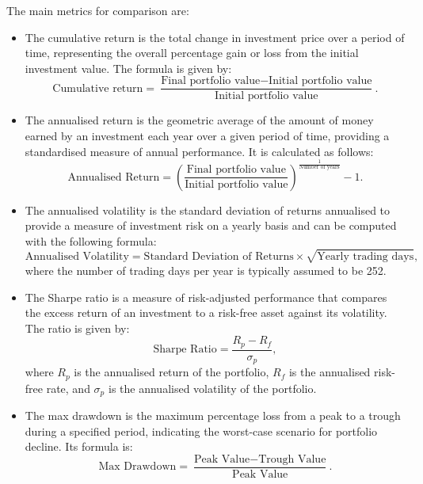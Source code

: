 The main metrics for comparison are:
\begin{itemize}
    \item The cumulative return is the total change in investment price over a period of time, representing the overall percentage gain or loss from the initial investment value. The formula is given by:
    \begin{equation}
        \text{Cumulative return} = \frac{\text{Final portfolio value} - \text{Initial portfolio value}}{\text{Initial portfolio value}}.
    \end{equation}
    \item The annualised return is the geometric average of the amount of money earned by an investment each year over a given period of time, providing a standardised measure of annual performance. It is calculated as follows:
    \begin{equation}
        \text{Annualised Return} = \left(\frac{\text{Final portfolio value}}{\text{Initial portfolio value}}\right)^{\frac{1}{\text{Number of years}}} - 1.
    \end{equation}
    \item The annualised volatility is the standard deviation of returns annualised to provide a measure of investment risk on a yearly basis and can be computed with the following formula:
    \begin{equation}
        \text{Annualised Volatility} = \text{Standard Deviation of Returns} \times \sqrt{\text{Yearly trading days}},
    \end{equation}
    where the number of trading days per year is typically assumed to be 252.
    \item The Sharpe ratio is a measure of risk-adjusted performance that compares the excess return of an investment to a risk-free asset against its volatility. The ratio is given by:
    \begin{equation}
        \text{Sharpe Ratio} = \frac{R_p - R_f}{\sigma_p},
    \end{equation}
    where $R_p$ is the annualised return of the portfolio, $R_f$ is the annualised risk-free rate, and $\sigma_p$ is the annualised volatility of the portfolio.
    \item The max drawdown is the maximum percentage loss from a peak to a trough during a specified period, indicating the worst-case scenario for portfolio decline. Its formula is:
    \begin{equation}
        \text{Max Drawdown} = \frac{\text{Peak Value} - \text{Trough Value}}{\text{Peak Value}}.
    \end{equation}
\end{itemize}
    
